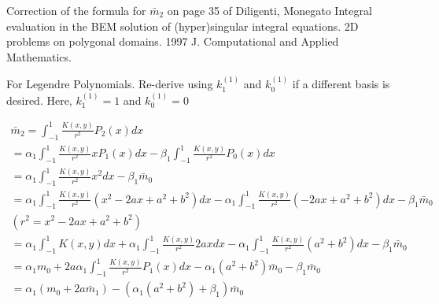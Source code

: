 \documentclass[a4paper,12pt]{article}
\begin{document}
 

Correction of the formula for $\bar{m}_2$ on page 35 of Diligenti, Monegato
Integral evaluation in the BEM solution of (hyper)singular integral 
equations. 2D problems on polygonal domains. 1997 J. Computational and 
Applied Mathematics.

For Legendre Polynomials. Re-derive using $k_1^{(1)}$ and $k_0^{(1)}$ if a 
different basis is desired. Here, $k_1^{(1)} = 1$ and $k_0^{(1)} = 0$

\begin{align}
    \bar{m}_2 = \int_{-1}^{1} \frac{K(x,y)}{r^2} P_2(x) dx \\
    = \alpha_1 \int_{-1}^{1} \frac{K(x,y)}{r^2} x P_1(x) dx - \beta_1 \int_{-1}^{1} \frac{K(x,y)}{r^2} P_0(x) dx \\
    = \alpha_1 \int_{-1}^{1} \frac{K(x,y)}{r^2} x^2  dx - \beta_1 \bar{m}_0   \\
    = \alpha_1 \int_{-1}^{1} \frac{K(x,y)}{r^2} (x^2 - 2ax + a^2 + b^2) dx - 
      \alpha_1 \int_{-1}^{1} \frac{K(x,y)}{r^2} (-2ax + a^2 + b^2)  dx -
      \beta_1 \bar{m}_0 \\
    (r^2 = x^2 - 2ax + a^2 + b^2) \\
    = \alpha_1 \int_{-1}^{1} K(x,y) dx +
      \alpha_1 \int_{-1}^{1} \frac{K(x,y)}{r^2} 2ax dx -
      \alpha_1 \int_{-1}^{1} \frac{K(x,y)}{r^2} (a^2 + b^2) dx -
      \beta_1 \bar{m}_0 \\
    = \alpha_1 m_0 +
      2 a \alpha_1 \int_{-1}^{1} \frac{K(x,y)}{r^2} P_1(x) dx -
      \alpha_1 (a^2 + b^2) \bar{m}_0 -
      \beta_1 \bar{m}_0 \\
    = \alpha_1 (m_0 + 2 a \bar{m}_1) - 
    (\alpha_1(a^2 + b^2) + \beta_1) \bar{m}_0
\end{align}
\end{document}
